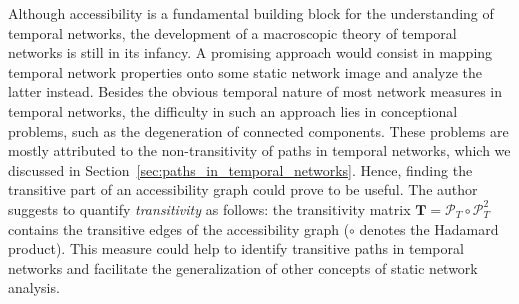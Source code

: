 Although accessibility is a fundamental building block for the understanding of temporal networks, the development of a macroscopic theory of temporal networks is still in its infancy.
A promising approach would consist in mapping temporal network properties onto some static network image and analyze the latter instead.
Besides the obvious temporal nature of most network measures in temporal networks, the difficulty in such an approach lies in conceptional problems, such as the degeneration of connected components.
These problems are mostly attributed to the non-transitivity of paths in temporal networks, which we discussed in Section~\ref{sec:paths_in_temporal_networks}.
Hence, finding the transitive part of an accessibility graph could prove to be useful.
The author suggests to quantify \emph{transitivity} as follows: the transitivity matrix $\mathbf{T}=\mathcal{P}_T\circ \mathcal{P}_T ^2$ contains the transitive edges of the accessibility graph ($\circ $ denotes the Hadamard product).
This measure could help to identify transitive paths in temporal networks and facilitate the generalization of other concepts of static network analysis.





